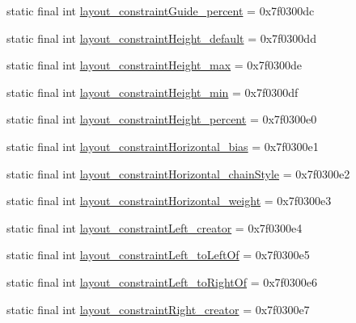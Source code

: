 \begin{DoxyCompactItemize}
\item 
static final int \mbox{\hyperlink{classandroid_1_1support_1_1constraint_1_1_r_1_1attr_a89c6858d46139a868584aeb07fc15b06}{layout\+\_\+constraint\+Guide\+\_\+percent}} = 0x7f0300dc
\item 
static final int \mbox{\hyperlink{classandroid_1_1support_1_1constraint_1_1_r_1_1attr_ad73139cb634d6cba3b7102b3dc13308d}{layout\+\_\+constraint\+Height\+\_\+default}} = 0x7f0300dd
\item 
static final int \mbox{\hyperlink{classandroid_1_1support_1_1constraint_1_1_r_1_1attr_a3035da0c0acb489260346cd375b58db9}{layout\+\_\+constraint\+Height\+\_\+max}} = 0x7f0300de
\item 
static final int \mbox{\hyperlink{classandroid_1_1support_1_1constraint_1_1_r_1_1attr_af07c577057f28eee1bd57df165fb790a}{layout\+\_\+constraint\+Height\+\_\+min}} = 0x7f0300df
\item 
static final int \mbox{\hyperlink{classandroid_1_1support_1_1constraint_1_1_r_1_1attr_aa8954a4bb588cb6d8967dfff0df5dada}{layout\+\_\+constraint\+Height\+\_\+percent}} = 0x7f0300e0
\item 
static final int \mbox{\hyperlink{classandroid_1_1support_1_1constraint_1_1_r_1_1attr_a3f57762e96618741e86fa450a044fda8}{layout\+\_\+constraint\+Horizontal\+\_\+bias}} = 0x7f0300e1
\item 
static final int \mbox{\hyperlink{classandroid_1_1support_1_1constraint_1_1_r_1_1attr_ae4c773b8f26637ab88042d5e2114ef25}{layout\+\_\+constraint\+Horizontal\+\_\+chain\+Style}} = 0x7f0300e2
\item 
static final int \mbox{\hyperlink{classandroid_1_1support_1_1constraint_1_1_r_1_1attr_a18d864472580035464d939072ecc8599}{layout\+\_\+constraint\+Horizontal\+\_\+weight}} = 0x7f0300e3
\item 
static final int \mbox{\hyperlink{classandroid_1_1support_1_1constraint_1_1_r_1_1attr_aca559da74ff0a015aff1f0db73de313b}{layout\+\_\+constraint\+Left\+\_\+creator}} = 0x7f0300e4
\item 
static final int \mbox{\hyperlink{classandroid_1_1support_1_1constraint_1_1_r_1_1attr_a7b56182d29aaed93f590f34f27840cbd}{layout\+\_\+constraint\+Left\+\_\+to\+Left\+Of}} = 0x7f0300e5
\item 
static final int \mbox{\hyperlink{classandroid_1_1support_1_1constraint_1_1_r_1_1attr_a5da7221e5f62e6b75cc78058a3d546e4}{layout\+\_\+constraint\+Left\+\_\+to\+Right\+Of}} = 0x7f0300e6
\item 
static final int \mbox{\hyperlink{classandroid_1_1support_1_1constraint_1_1_r_1_1attr_a329b366dcf35072950ba35c2ebaccbb3}{layout\+\_\+constraint\+Right\+\_\+creator}} = 0x7f0300e7

\end{DoxyCompactItemize}
